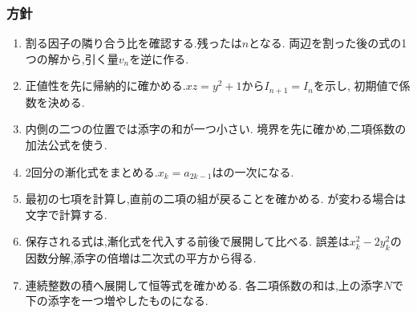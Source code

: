 \subsubsection{方針}
\begin{enumerate}[label=\textbf{問\arabic*.},format=\bookitemlink{practice-connections}{hint}{problem}]
  \item 割る因子の隣り合う比を確認する.残ったは$n$となる.
    両辺を割った後の式の1つの解から,引く量$v_n$を逆に作る.
  \item 正値性を先に帰納的に確かめる.$xz=y^2+1$から$I_{n+1}=I_n$を示し,
    初期値で係数を決める.
  \item 内側の二つの位置では添字の和が一つ小さい.
    境界を先に確かめ,二項係数の加法公式を使う.
  \item 2回分の漸化式をまとめる.$x_k=a_{2k-1}$はの一次になる.
  \item 最初の七項を計算し,直前の二項の組が戻ることを確かめる.
    が変わる場合は文字で計算する.
  \item 保存される式は,漸化式を代入する前後で展開して比べる.
    誤差は$x_k^2-2y_k^2$の因数分解,添字の倍増は二次式の平方から得る.
  \item 連続整数の積へ展開して恒等式を確かめる.
    各二項係数の和は,上の添字$N$で下の添字を一つ増やしたものになる.
\end{enumerate}

